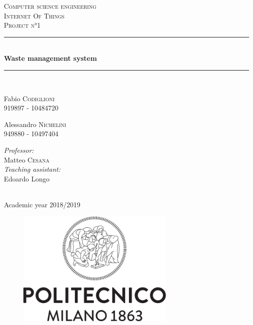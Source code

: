 \documentclass[a4paper, 11pt, parskip=half]{scrartcl}
\begin{document}
\begin{titlepage}
\newcommand{\HRule}{\rule{\linewidth}{0.1mm}} 
\center %
 

\textsc{Computer science engineering}\\[0.3cm] %
\textsc{\Large Internet Of Things}\\[0.5cm] %
\textsc{\large Project n°1}\\[0.5cm] %


\HRule \\[0.4cm]
{ \huge \bfseries Waste management system}\\[0.1cm] %
\HRule \\[1.5cm]
 

\begin{minipage}{0.4\textwidth}
\begin{flushleft} \large

Fabio \textsc{Codiglioni}\\ 919897 - 10484720  %
\end{flushleft}
\begin{flushleft} \large


Alessandro \textsc{Nichelini}\\ 949880 - 10497404  %
\end{flushleft}


\end{minipage}
\begin{minipage}{0.4\textwidth}

\begin{flushright} \large
\emph{Professor:}\\
Matteo \textsc{Cesana} \\[0.4cm]%
\emph{Teaching assistant:} \\
Edoardo Longo
\end{flushright}

\end{minipage}\\[1cm]
{\large Academic year 2018/2019}
\begin{figure}[H]
	\centering
	\includegraphics[width=\textwidth,height=5.7cm,keepaspectratio]{resources/polimi_logo}%
\end{figure}


\end{titlepage}
\end{document}
